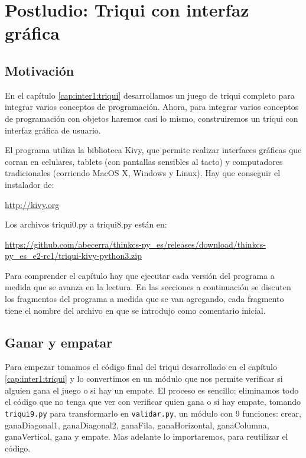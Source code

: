 
\chapter{Postludio: Triqui con interfaz gráfica }

\label{triqui-kivy}


\section{Motivación}

En el capítulo \ref{cap:inter1:triqui} desarrollamos un juego de
triqui completo para integrar varios conceptos de programación. Ahora,
para integrar varios conceptos de programación con objetos haremos
casi lo mismo, construiremos un triqui con interfaz gráfica de usuario.

El programa utiliza la biblioteca Kivy, que permite realizar interfaces
gráficas que corran en celulares, tablets (con pantallas sensibles
al tacto) y computadores tradicionales (corriendo MacOS X, Windows
y Linux). Hay que conseguir el instalador de:

\url{ http://kivy.org}

Los archivos triqui0.py a triqui8.py están en:

\url{https://github.com/abecerra/thinkcs-py_es/releases/download/thinkcs-py_es_e2-rc1/triqui-kivy-python3.zip}

Para comprender el capítulo hay que ejecutar cada versión del programa
a medida que se avanza en la lectura. En las secciones a continuación
se discuten los fragmentos del programa a medida que se van agregando,
cada fragmento tiene el nombre del archivo en que se introdujo como
comentario inicial.

\section{Ganar y empatar}

Para empezar tomamos el código final del triqui desarrollado en el
capítulo \ref{cap:inter1:triqui} y lo convertimos en un módulo que
nos permite verificar si alguien gana el juego o si hay un empate.
El proceso es sencillo: eliminamos todo el código que no tenga que
ver con verificar quien gana o si hay empate, tomando \texttt{triqui9.py}
para transformarlo en \texttt{validar.py}, un módulo con 9 funciones:
crear, ganaDiagonal1, ganaDiagonal2, ganaFila, ganaHorizontal, ganaColumna,
ganaVertical, gana y empate. Mas adelante lo importaremos, para reutilizar
el código.

